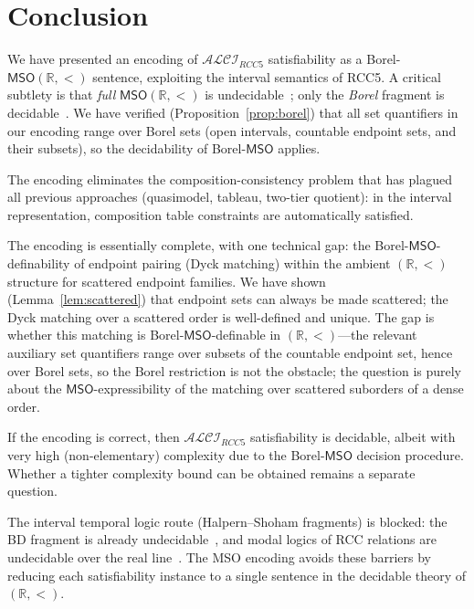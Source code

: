 \documentclass[a4paper,11pt]{article}
\theoremstyle{definition}
\newcommand{\ALCIRCC}[1]{\ensuremath{\mathcal{ALCI}_{\mathit{RCC#1}}}}
\newcommand{\MSO}{\ensuremath{\mathsf{MSO}}}
\newcommand{\reals}{\ensuremath{\mathbb{R}}}
\begin{document}
\section{Conclusion}
\label{sec:conclusion}

We have presented an encoding of $\ALCIRCC{5}$ satisfiability as a
Borel-$\MSO(\reals, <)$ sentence, exploiting the interval semantics
of RCC5.  A critical subtlety is that \emph{full} $\MSO(\reals, <)$
is undecidable~\cite{Shelah1975,GurevichShelah1982}; only the
\emph{Borel} fragment is decidable~\cite{Manthe2024}.  We have
verified (Proposition~\ref{prop:borel}) that all set quantifiers in
our encoding range over Borel sets (open intervals, countable
endpoint sets, and their subsets), so the decidability of
Borel-$\MSO$ applies.

The encoding eliminates the composition-consistency problem
that has plagued all previous approaches (quasimodel, tableau,
two-tier quotient): in the interval representation, composition
table constraints are automatically satisfied.

The encoding is essentially complete, with one technical gap: the
Borel-$\MSO$-definability of endpoint pairing (Dyck matching) within
the ambient $(\reals, <)$ structure for scattered endpoint families.
We have shown (Lemma~\ref{lem:scattered}) that endpoint sets can
always be made scattered; the Dyck matching over a scattered order
is well-defined and unique.  The gap is whether this matching is
Borel-$\MSO$-definable in $(\reals, <)$---the relevant auxiliary set
quantifiers range over subsets of the countable endpoint set, hence
over Borel sets, so the Borel restriction is not the obstacle; the
question is purely about the $\MSO$-expressibility of the matching
over scattered suborders of a dense order.

If the encoding is correct, then $\ALCIRCC{5}$ satisfiability is
decidable, albeit with very high (non-elementary) complexity due to
the Borel-$\MSO$ decision procedure.  Whether a tighter complexity
bound can be obtained remains a separate question.

The interval temporal logic route (Halpern--Shoham fragments) is
blocked: the BD fragment is already undecidable~\cite{BresolinBD2010},
and modal logics of RCC relations are undecidable over the real
line~\cite{LutzWolter2006}.  The MSO encoding avoids these
barriers by reducing each satisfiability instance to a single
sentence in the decidable theory of $(\reals, <)$.
\end{document}
